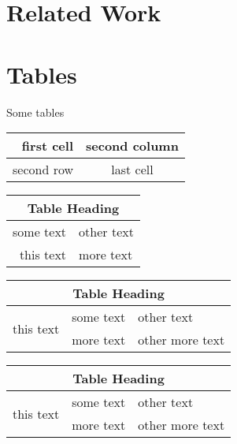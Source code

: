 \documentclass[12pt,twoside,a4paper]{article}
\begin{document}
\lipsum[1-4]

\section{Related Work}
\singlespacing

\lipsum[5-6]

\section{Tables}

Some tables

\vspace{0.2in}

\begin{tabular}{| r | c |}
\hline
first cell & second column \\
\hline
second row & last cell \\
\hline
\end{tabular}

\vspace{0.2in}

\begin{tabular}{ | r | l | }
    \hline
    \multicolumn{2}{|c|}{Table Heading} \\
    \hline
    some text & other text \\
this text & more text \\
    \hline
\end{tabular}

\vspace{0.2in}

\begin{tabular}{ | r | c | l | }
    \hline
    \multicolumn{3}{|c|}{Table Heading} \\
\hline
    \multirow{2}{*}{this text} & some text & other text \\
     & more text & other more text \\
    \hline
\end{tabular}

\vspace{0.2in}

\begin{tabularx}{\textwidth}{ | X | X | X | }
    \hline
    \multicolumn{3}{|c|}{Table Heading} \\
\hline
    \multirow{2}{*}{this text} & some text & other text \\
     & more text & other more text \\
    \hline
\end{tabularx}
\end{document}
